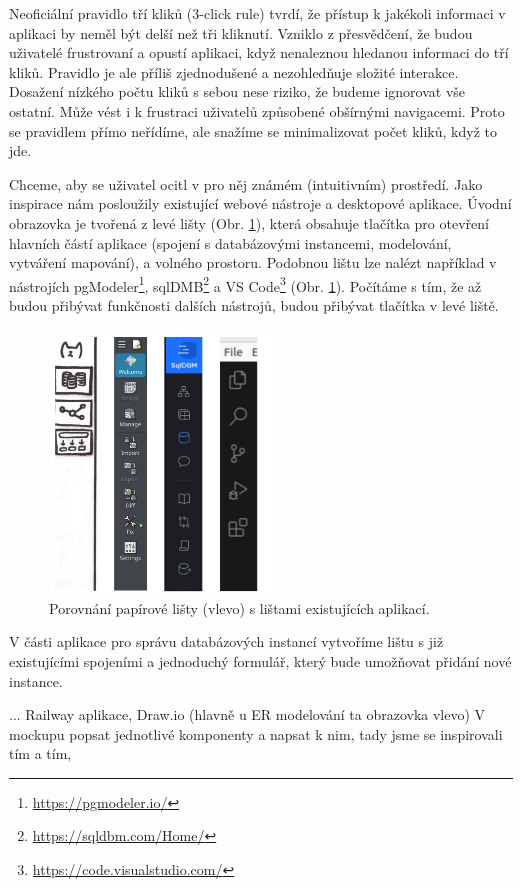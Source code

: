 Neoficiální pravidlo tří kliků (3-click rule) tvrdí, že přístup k jakékoli informaci v aplikaci by neměl být delší než tři kliknutí. Vzniklo z přesvědčení, že budou uživatelé frustrovaní a opustí aplikaci, když nenaleznou hledanou informaci do tří kliků. Pravidlo je ale příliš zjednodušené a nezohledňuje složité interakce. Dosažení nízkého počtu kliků s sebou nese riziko, že budeme ignorovat vše ostatní. Může vést i k frustraci uživatelů způsobené obšírnými navigacemi. Proto se pravidlem přímo neřídíme, ale snažíme se minimalizovat počet kliků, když to jde.

Chceme, aby se uživatel ocitl v pro něj známém (intuitivním) prostředí. Jako inspirace nám posloužily existující webové nástroje a desktopové aplikace. Úvodní obrazovka je tvořená z levé lišty (Obr. \ref{obr05:listy}), která obsahuje tlačítka pro otevření hlavních částí aplikace (spojení s databázovými instancemi, modelování, vytváření mapování), a volného prostoru. Podobnou lištu lze nalézt například v nástrojích pgModeler\footnote{\url{https://pgmodeler.io/}}, sqlDMB\footnote{\url{https://sqldbm.com/Home/}} a VS Code\footnote{\url{https://code.visualstudio.com/}} (Obr. \ref{obr05:listy}). Počítáme s tím, že až budou přibývat funkčnosti dalších nástrojů, budou přibývat tlačítka v levé liště.

\begin{figure}[htb]
  \centering
  \includegraphics[height=70mm]{../img/listy}
  \caption{Porovnání papírové lišty (vlevo) s lištami existujících aplikací.}
  \label{obr05:listy}
\end{figure}

V části aplikace pro správu databázových instancí vytvoříme lištu s již existujícími spojeními a jednoduchý formulář, který bude umožňovat přidání nové instance.

  ... Railway aplikace, Draw.io (hlavně u ER modelování ta obrazovka vlevo) 
V mockupu popsat jednotlivé komponenty a napsat k nim, tady jsme se inspirovali tím a tím,

